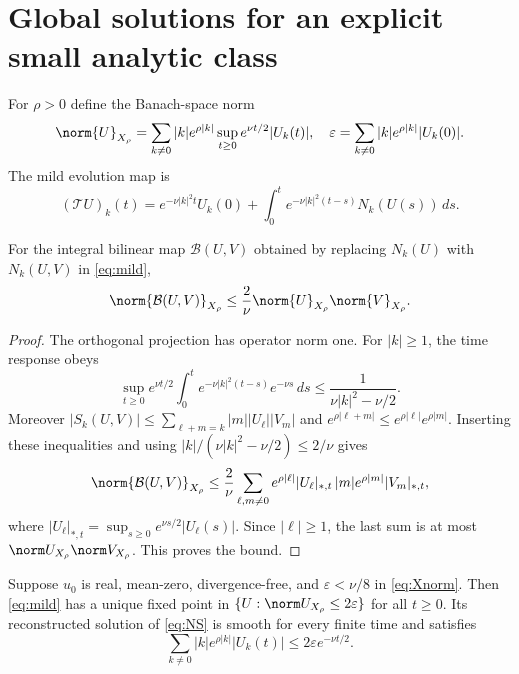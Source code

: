 \section{Global solutions for an explicit small analytic class}
For $\rho>0$ define the Banach-space norm
\begin{equation}\label{eq:Xnorm}
\norm{U}_{X_\rho}=\sum_{k\ne0}|k|e^{\rho|k|}
\sup_{t\ge0}e^{\nu t/2}|U_k(t)|,
\quad \varepsilon=\sum_{k\ne0}|k|e^{\rho|k|}|U_k(0)|.
\end{equation}
The mild evolution map is
\begin{equation}\label{eq:mild}
(\mathcal TU)_k(t)=e^{-\nu|k|^2t}U_k(0)+\int_0^t e^{-\nu|k|^2(t-s)}N_k(U(s))\,ds.
\end{equation}
\begin{lemma}\label{lem:bilinear}
For the integral bilinear map $\mathcal B(U,V)$ obtained by replacing $N_k(U)$ with $N_k(U,V)$ in \eqref{eq:mild},
\begin{equation}\label{eq:bilinear}
\norm{\mathcal B(U,V)}_{X_\rho}\le\frac2\nu\norm{U}_{X_\rho}\norm{V}_{X_\rho}.
\end{equation}
\end{lemma}
\begin{proof}
The orthogonal projection has operator norm one. For $|k|\ge1$, the time response obeys
\[
\sup_{t\ge0} e^{\nu t/2}\int_0^t e^{-\nu|k|^2(t-s)}e^{-\nu s}\,ds
\le\frac1{\nu|k|^2-\nu/2}.
\]
Moreover $|S_k(U,V)|\le\sum_{\ell+m=k}|m||U_\ell||V_m|$ and
$e^{\rho|\ell+m|}\le e^{\rho|\ell|}e^{\rho|m|}$. Inserting these inequalities and using
$|k|/(\nu|k|^2-\nu/2)\le2/\nu$ gives
\[
\norm{\mathcal B(U,V)}_{X_\rho}\le\frac2\nu
\sum_{\ell,m\ne0} e^{\rho|\ell|}|U_\ell|_{*,t}
\,|m|e^{\rho|m|}|V_m|_{*,t},
\]
where $|U_\ell|_{*,t}=\sup_{s\ge0}e^{\nu s/2}|U_\ell(s)|$. Since $|\ell|\ge1$, the last sum is at most $\norm U_{X_\rho}\norm V_{X_\rho}$. This proves the bound.
\end{proof}
\begin{theorem}\label{thm:small}
Suppose $u_0$ is real, mean-zero, divergence-free, and $\varepsilon<\nu/8$ in \eqref{eq:Xnorm}. Then \eqref{eq:mild} has a unique fixed point in $\{U:\norm U_{X_\rho}\le2\varepsilon\}$ for all $t\ge0$. Its reconstructed solution of \eqref{eq:NS} is smooth for every finite time and satisfies
\begin{equation}\label{eq:analytic}
\sum_{k\ne0}|k|e^{\rho|k|}|U_k(t)|\le2\varepsilon e^{-\nu t/2}.
\end{equation}
\end{theorem}
